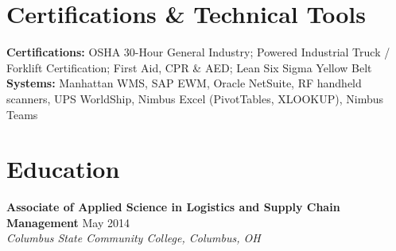 \documentclass[10pt,letterpaper]{article}
\begin{document}
\section*{Certifications \& Technical Tools}
\textbf{Certifications:} OSHA 30-Hour General Industry; Powered Industrial Truck / Forklift Certification; First Aid, CPR \& AED; Lean Six Sigma Yellow Belt\\
\textbf{Systems:} Manhattan WMS, SAP EWM, Oracle NetSuite, RF handheld scanners, UPS WorldShip, Nimbus Excel (PivotTables, XLOOKUP), Nimbus Teams

\section*{Education}
\textbf{Associate of Applied Science in Logistics and Supply Chain Management} \hfill May 2014\\[-0.08em]
\textit{Columbus State Community College, Columbus, OH}
\end{document}
